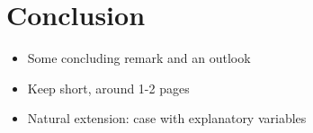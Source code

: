 \section{Conclusion}
\begin{itemize}
	\item Some concluding remark and an outlook
	\item Keep short, around 1-2 pages
	\item Natural extension: case with explanatory variables
\end{itemize}